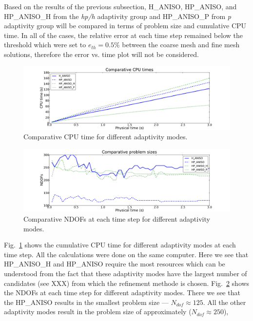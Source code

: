 Based on the results of the previous subsection, H\_ANISO, HP\_ANISO,
and HP\_ANISO\_H from the \emph{hp/h} adaptivity group and HP\_ANISO\_P
from \emph{p} adaptivity group will be compared
in terms of problem size and cumulative CPU time. 
In all of the cases, the relative 
error at each time step remained below
the threshold which were set to $e_{th}=0.5\%$ between the coarse mesh
and fine mesh solutions, therefore the error vs. time plot will not be considered.

\begin{figure}
  \begin{centering}
  \includegraphics[width=\columnwidth]{cpu}
  \caption{\label{fig:cpu} Comparative CPU time for different adaptivity modes.}
  \end{centering}
\end{figure}

\begin{figure}
  \begin{centering}
  \includegraphics[width=\columnwidth]{dof}
  \caption{\label{fig:dof} Comparative NDOFs at each time step for 
  different adaptivity modes.}
  \end{centering}
\end{figure}

Fig.~\ref{fig:cpu} shows the cumulative CPU time for different adaptivity
modes at each time step. All the calculations were done on the same computer.
Here we see that HP\_ANISO\_H and HP\_ANISO require the most
resources which can be understood from the fact that these 
adaptivity modes have the largest number of 
candidates (see XXX) from which the refinement methode is chosen.
Fig.~\ref{fig:dof} shows the NDOFs at each time step for different adaptivity modes.
There we see that the HP\_ANISO results in the 
smallest problem size --- $N_{dof} \approx 125$. 
All the other adaptivity modes result in the 
problem size of approximately ($N_{dof} \approx 250$), 


